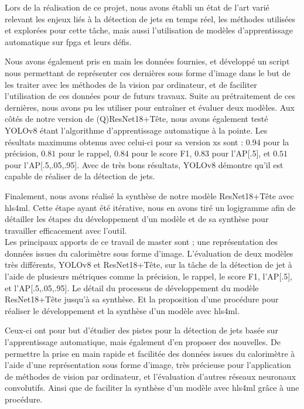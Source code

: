 Lors de la réalisation de ce projet, nous avons établi un état de l'art varié relevant les enjeux liés à la détection de jets en temps réel, les méthodes utilisées et explorées pour cette tâche, mais aussi l'utilisation de modèles d'apprentissage automatique sur \acrshort{fpga} et leurs défis.

Nous avons également pris en main les données fournies, et développé un script nous permettant de représenter ces dernières sous forme d'image dans le but de les traiter avec les méthodes de la vision par ordinateur, et de faciliter l'utilisation de ces données pour de futurs travaux. Suite au prétraitement de ces dernières, nous avons pu les utiliser pour entraîner et évaluer deux modèles. Aux côtés de notre version de (Q)ResNet18+Tête, nous avons également testé YOLOv8 étant l'algorithme d'apprentissage automatique à la pointe. Les résultats maximums obtenus avec celui-ci pour sa version xs sont : $0.94$ pour la précision, $0.81$ pour le rappel, $0.84$ pour le score F1, $0.83$ pour l'AP[.5], et $0.51$ pour l'AP[.5,.05,.95]. Avec de très bons résultats, YOLOv8 démontre qu'il est capable de réaliser de la détection de jets.

Finalement, nous avons réalisé la synthèse de notre modèle ResNet18+Tête avec \acrshort{hls4ml}. Cette étape ayant été itérative, nous en avons tiré un logigramme afin de détailler les étapes du développement d'un modèle et de sa synthèse pour travailler efficacement avec l'outil.\\

Les principaux apports de ce travail de master sont ; une représentation des données issues du calorimètre sous forme d'image. L'évaluation de deux modèles très différents, YOLOv8 et ResNet18+Tête, sur la tâche de la détection de jet à l'aide de plusieurs métriques comme la précision, le rappel, le score F1, l'AP[.5], et l'AP[.5,.05,.95]. Le détail du processus de développement du modèle ResNet18+Tête jusqu'à sa synthèse. Et la proposition d'une procédure pour réaliser le développement et la synthèse d'un modèle avec \acrshort{hls4ml}.

Ceux-ci ont pour but d'étudier des pistes pour la détection de jets basée sur l'apprentissage automatique, mais également d'en proposer des nouvelles. De permettre la prise en main rapide et facilitée des données issues du calorimètre à l'aide d'une représentation sous forme d'image, très précieuse pour l'application de méthodes de vision par ordinateur, et l'évaluation d'autres réseaux neuronaux convolutifs. Ainsi que de faciliter la synthèse d'un modèle avec \acrshort{hls4ml} grâce à une procédure.\\

